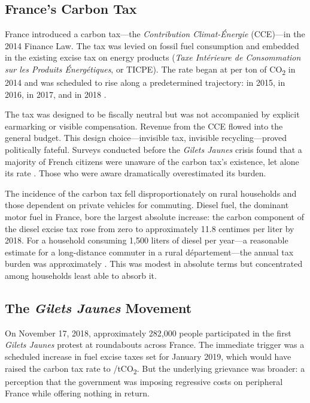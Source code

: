\documentclass[12pt]{article}
\newcommand{\gj}{\textit{Gilets Jaunes}}
\newcommand{\dept}{d\'{e}partement}
\begin{document}
\subsection{France's Carbon Tax}

France introduced a carbon tax---the \textit{Contribution Climat-\'{E}nergie} (CCE)---in the 2014 Finance Law. The tax was levied on fossil fuel consumption and embedded in the existing excise tax on energy products (\textit{Taxe Int\'{e}rieure de Consommation sur les Produits \'{E}nerg\'{e}tiques}, or TICPE). The rate began at  per ton of CO\textsubscript{2} in 2014 and was scheduled to rise along a predetermined trajectory:  in 2015,  in 2016,  in 2017, and  in 2018 \citep{bureau2019distributional}.

The tax was designed to be fiscally neutral but was not accompanied by explicit earmarking or visible compensation. Revenue from the CCE flowed into the general budget. This design choice---invisible tax, invisible recycling---proved politically fateful. Surveys conducted before the \gj{} crisis found that a majority of French citizens were unaware of the carbon tax's existence, let alone its rate \citep{douenne2020french}. Those who were aware dramatically overestimated its burden.

The incidence of the carbon tax fell disproportionately on rural households and those dependent on private vehicles for commuting. Diesel fuel, the dominant motor fuel in France, bore the largest absolute increase: the carbon component of the diesel excise tax rose from zero to approximately 11.8 centimes per liter by 2018. For a household consuming 1,500 liters of diesel per year---a reasonable estimate for a long-distance commuter in a rural \dept{}---the annual tax burden was approximately . This was modest in absolute terms but concentrated among households least able to absorb it.

\subsection{The \gj{} Movement}

On November 17, 2018, approximately 282,000 people participated in the first \gj{} protest at roundabouts across France. The immediate trigger was a scheduled increase in fuel excise taxes set for January 2019, which would have raised the carbon tax rate to /tCO\textsubscript{2}. But the underlying grievance was broader: a perception that the government was imposing regressive costs on peripheral France while offering nothing in return.
\end{document}
